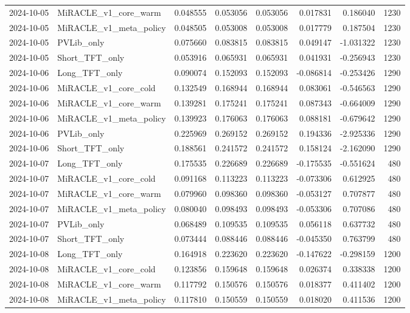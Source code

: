 \begin{tabular}{llrrrrrr}
2024-10-05 & MiRACLE_v1_core_warm & 0.048555 & 0.053056 & 0.053056 & 0.017831 & 0.186040 & 1230 \\
2024-10-05 & MiRACLE_v1_meta_policy & 0.048505 & 0.053008 & 0.053008 & 0.017779 & 0.187504 & 1230 \\
2024-10-05 & PVLib_only & 0.075660 & 0.083815 & 0.083815 & 0.049147 & -1.031322 & 1230 \\
2024-10-05 & Short_TFT_only & 0.053916 & 0.065931 & 0.065931 & 0.041931 & -0.256943 & 1230 \\
2024-10-06 & Long_TFT_only & 0.090074 & 0.152093 & 0.152093 & -0.086814 & -0.253426 & 1290 \\
2024-10-06 & MiRACLE_v1_core_cold & 0.132549 & 0.168944 & 0.168944 & 0.083061 & -0.546563 & 1290 \\
2024-10-06 & MiRACLE_v1_core_warm & 0.139281 & 0.175241 & 0.175241 & 0.087343 & -0.664009 & 1290 \\
2024-10-06 & MiRACLE_v1_meta_policy & 0.139923 & 0.176063 & 0.176063 & 0.088181 & -0.679642 & 1290 \\
2024-10-06 & PVLib_only & 0.225969 & 0.269152 & 0.269152 & 0.194336 & -2.925336 & 1290 \\
2024-10-06 & Short_TFT_only & 0.188561 & 0.241572 & 0.241572 & 0.158124 & -2.162090 & 1290 \\
2024-10-07 & Long_TFT_only & 0.175535 & 0.226689 & 0.226689 & -0.175535 & -0.551624 & 480 \\
2024-10-07 & MiRACLE_v1_core_cold & 0.091168 & 0.113223 & 0.113223 & -0.073306 & 0.612925 & 480 \\
2024-10-07 & MiRACLE_v1_core_warm & 0.079960 & 0.098360 & 0.098360 & -0.053127 & 0.707877 & 480 \\
2024-10-07 & MiRACLE_v1_meta_policy & 0.080040 & 0.098493 & 0.098493 & -0.053306 & 0.707086 & 480 \\
2024-10-07 & PVLib_only & 0.068489 & 0.109535 & 0.109535 & 0.056118 & 0.637732 & 480 \\
2024-10-07 & Short_TFT_only & 0.073444 & 0.088446 & 0.088446 & -0.045350 & 0.763799 & 480 \\
2024-10-08 & Long_TFT_only & 0.164918 & 0.223620 & 0.223620 & -0.147622 & -0.298159 & 1200 \\
2024-10-08 & MiRACLE_v1_core_cold & 0.123856 & 0.159648 & 0.159648 & 0.026374 & 0.338338 & 1200 \\
2024-10-08 & MiRACLE_v1_core_warm & 0.117792 & 0.150576 & 0.150576 & 0.018377 & 0.411402 & 1200 \\
2024-10-08 & MiRACLE_v1_meta_policy & 0.117810 & 0.150559 & 0.150559 & 0.018020 & 0.411536 & 1200 \\

\end{tabular}

